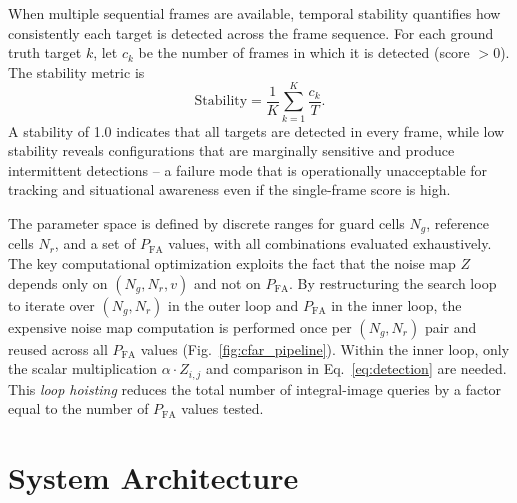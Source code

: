 \documentclass[conf]{new-aiaa}
\begin{document}
\label{sec:stability}

When multiple sequential frames are available, temporal stability quantifies how consistently each target is detected across the frame sequence. For each ground truth target $k$, let $c_k$ be the number of frames in which it is detected (score $> 0$). The stability metric is
\begin{equation}
    \mathrm{Stability} = \frac{1}{K}\sum_{k=1}^{K} \frac{c_k}{T}. \label{eq:stability}
\end{equation}
A stability of 1.0 indicates that all targets are detected in every frame, while low stability reveals configurations that are marginally sensitive and produce intermittent detections -- a failure mode that is operationally unacceptable for tracking and situational awareness even if the single-frame score is high.

\label{sec:grid_search}

The parameter space is defined by discrete ranges for guard cells $N_g$, reference cells $N_r$, and a set of $P_{\mathrm{FA}}$ values, with all combinations evaluated exhaustively. The key computational optimization exploits the fact that the noise map $Z$ depends only on $(N_g, N_r, v)$ and not on $P_{\mathrm{FA}}$. By restructuring the search loop to iterate over $(N_g, N_r)$ in the outer loop and $P_{\mathrm{FA}}$ in the inner loop, the expensive noise map computation is performed once per $(N_g, N_r)$ pair and reused across all $P_{\mathrm{FA}}$ values (Fig.~\ref{fig:cfar_pipeline}). Within the inner loop, only the scalar multiplication $\alpha \cdot Z_{i,j}$ and comparison in Eq.~\eqref{eq:detection} are needed. This \emph{loop hoisting} reduces the total number of integral-image queries by a factor equal to the number of $P_{\mathrm{FA}}$ values tested.


\section{System Architecture}
\end{document}
